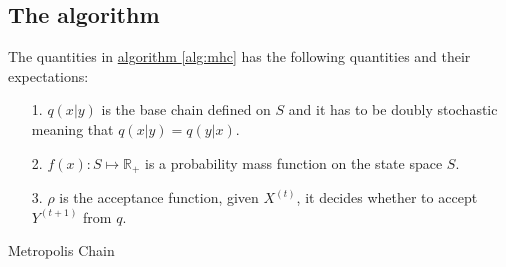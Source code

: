 \documentclass[]{article}
\theoremstyle{definition}
\begin{document}
    \subsection{The algorithm}
        The quantities in \hyperref[alg:mhc]{algorithm \ref*{alg:mhc}} has the following quantities and their expectations: 
        \begin{itemize}
            \item [1.] $q(x|y)$ is the base chain defined on $S$ and it has to be doubly stochastic meaning that $q(x|y) = q(y|x)$. 
            \item [2.] $f(x): S \mapsto \mathbb R_+$ is a probability mass function on the state space $S$.
            \item [3.] $\rho$ is the acceptance function, given $X^{(t)}$, it decides whether to accept $Y^{(t + 1)}$ from $q$. 
        \end{itemize}
        \begin{algorithm}
            \begin{algorithmic}[H]
            \end{algorithmic}
            \caption{Metropolis Chain}
            \label{alg:mhc}
        \end{algorithm}
    
\end{document}
